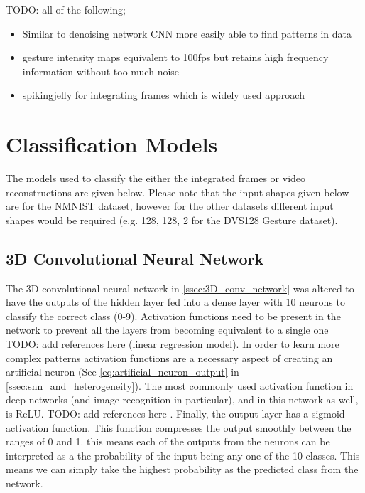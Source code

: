 \color{red} TODO: all of the following;

\begin{itemize}
    \item Similar to denoising network CNN more easily able to find patterns in data
    \item gesture intensity maps equivalent to 100fps but retains high frequency information without too much noise
    \item spikingjelly for integrating frames which is widely used approach
\end{itemize}

\color{black}

\section{Classification Models}

The models used to classify the either the integrated frames or video reconstructions are given below. Please note that the input shapes given below are for the NMNIST dataset, however for the other datasets different input shapes would be required (e.g. {128, 128, 2} for the DVS128 Gesture dataset).

\subsection{3D Convolutional Neural Network}

The 3D convolutional neural network in \cref{ssec:3D_conv_network} was altered to have the outputs of the hidden layer fed into a dense layer with 10 neurons to classify the correct class (0-9). Activation functions need to be present in the network to prevent all the layers from becoming equivalent to a single one \color{red} TODO: add references here \color{black} (linear regression model). In order to learn more complex patterns activation functions are a necessary aspect of creating an artificial neuron (See \cref{eq:artificial_neuron_output} in \cref{ssec:snn_and_heterogeneity}). The most commonly used activation function in deep networks (and image recognition in particular), and in this network as well, is ReLU. \color{red} TODO: add references here \color{black}. Finally, the output layer has a sigmoid activation function. This function compresses the output smoothly between the ranges of 0 and 1. this means each of the outputs from the neurons can be interpreted as a the probability of the input being any one of the 10 classes. This means we can simply take the highest probability as the predicted class from the network.

